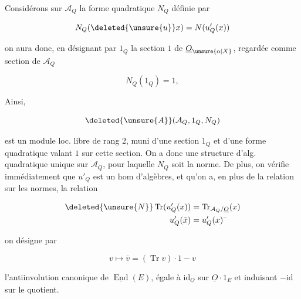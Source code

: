 
Considérons sur $\mathcal A_Q$ la forme quadratique $N_Q$ définie par 

\[
N_Q(\deleted{\unsure{u}}x)=N(u'_Q(x))
\]

on aura donc, en désignant par $1_Q$ la section $1$ de $\underline O_{\unsure{\alpha|X}}$, regardée comme section de $\mathcal A_Q$

\[
N_Q(1_Q)=1,
\]

Ainsi,

\[
\deleted{\unsure{A}}(\mathcal A_Q,1_Q,N_Q)
\]

est un module loc. libre de rang 2, muni d'une section $1_Q$ et d'une forme quadratique valant $1$ sur cette section. On a donc une structure d'alg. quadratique unique sur $\mathcal A_Q$, pour laquelle $N_Q$ soit la norme. De plus, on vérifie immédiatement que $u'_Q$ est un hom d'algèbres, et qu'on a, en plus de la relation sur les normes, la relation

\[
\begin{aligned}
\deleted{\unsure{N}}\operatorname{Tr}(u'_Q(x))&=\operatorname{Tr}_{\mathcal A_Q/\underline O}(x)\\
u'_Q(\bar x)&=u'_Q(x)^{\text{--}}
\end{aligned}
\]

 on désigne par

\[
v\longmapsto\bar v=(\operatorname{Tr}v)\cdot1-v
\]

l'antiinvolution canonique de $\underline{\operatorname{End}}(E)$, égale à $\mathrm{id}_{\underline O}$ sur $\underline O\cdot1_E$ et induisant $-\mathrm{id}$ sur le quotient.
